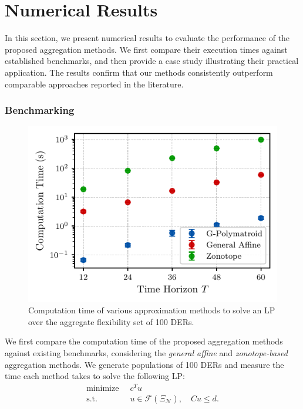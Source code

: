 \section{Numerical Results}\label{sec:numerical_results}

In this section, we present numerical results to evaluate the performance of the proposed aggregation methods. We first compare their execution times against established benchmarks, and then provide a case study illustrating their practical application. The results confirm that our methods consistently outperform comparable approaches reported in the literature.

\subsubsection{Benchmarking}
\begin{figure}[t]
    \centering
    \includegraphics[width=\columnwidth]{./figures/benchmark_plot.pdf}
    \caption{Computation time of various approximation methods to  solve an LP over the aggregate flexibility set of 100 DERs.}
    \label{fig:benchmarking}
  \end{figure}
We first compare the computation time of the proposed aggregation methods against existing benchmarks, considering the \textit{general affine} \cite{Taha2024AnPopulations} and \textit{zonotope-based} \cite{Muller2019AggregationResources} aggregation methods. 
We generate populations of 100 DERs and measure the time each method takes to solve the following LP:
\begin{equation}\label{prob:cost_min}
\begin{aligned}
    \textrm{minimize} \;\; &c^T u \\
    \textrm{s.t.} \;\; &u \in \mathcal{F}(\Xi_{\mathcal{N}}), \quad 
                             Cu \leq d.
\end{aligned}
\end{equation}
